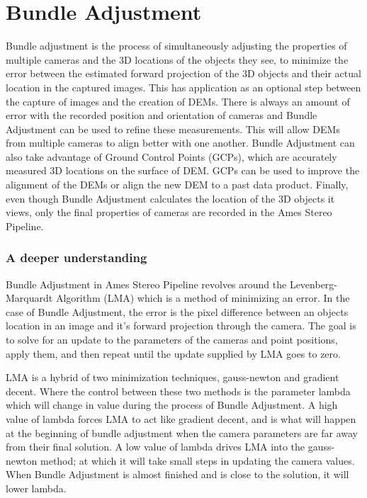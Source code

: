 \chapter{Bundle Adjustment}

Bundle adjustment is the process of simultaneously adjusting the
properties of multiple cameras and the 3D locations of the objects
they see, to minimize the error between the estimated forward
projection of the 3D objects and their actual location in the captured
images. This has application as an optional step between the capture
of images and the creation of DEMs. There is always an amount of error
with the recorded position and orientation of cameras and Bundle
Adjustment can be used to refine these measurements. This will allow
DEMs from multiple cameras to align better with one another. Bundle
Adjustment can also take advantage of Ground Control Points (GCPs),
which are accurately measured 3D locations on the surface of DEM. GCPs
can be used to improve the alignment of the DEMs or align the new DEM
to a past data product. Finally, even though Bundle Adjustment
calculates the location of the 3D objects it views, only the final
properties of cameras are recorded in the Ames Stereo Pipeline.

\subsection{A deeper understanding}

Bundle Adjustment in Ames Stereo Pipeline revolves around the
Levenberg-Marquardt Algorithm (LMA) which is a method of minimizing an
error. In the case of Bundle Adjustment, the error is the pixel
difference between an objects location in an image and it's forward
projection through the camera. The goal is to solve for an update to
the parameters of the cameras and point positions, apply them, and
then repeat until the update supplied by LMA goes to zero.

LMA is a hybrid of two minimization techniques, gauss-newton and
gradient decent. Where the control between these two methods is the
parameter lambda which will change in value during the process of
Bundle Adjustment. A high value of lambda forces LMA to act like
gradient decent, and is what will happen at the beginning of bundle
adjustment when the camera parameters are far away from their final
solution. A low value of lambda drives LMA into the gauss-newton
method; at which it will take small steps in updating the camera
values. When Bundle Adjustment is almost finished and is close to the
solution, it will lower lambda.

